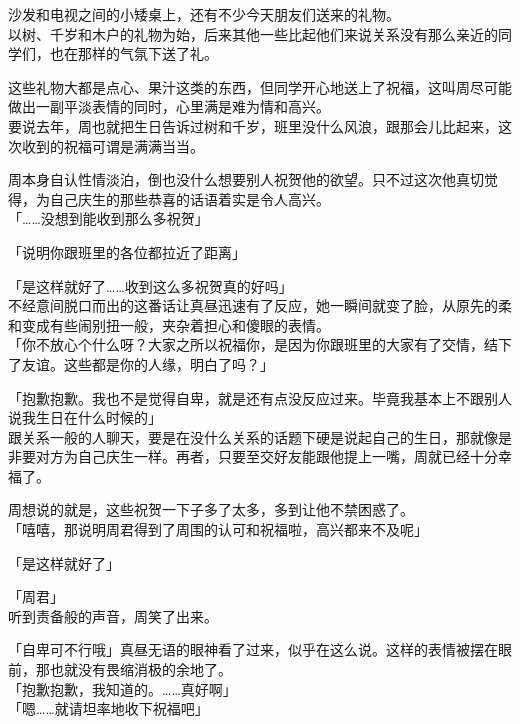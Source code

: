 沙发和电视之间的小矮桌上，还有不少今天朋友们送来的礼物。\\

以树、千岁和木户的礼物为始，后来其他一些比起他们来说关系没有那么亲近的同学们，也在那样的气氛下送了礼。

这些礼物大都是点心、果汁这类的东西，但同学开心地送上了祝福，这叫周尽可能做出一副平淡表情的同时，心里满是难为情和高兴。\\

要说去年，周也就把生日告诉过树和千岁，班里没什么风浪，跟那会儿比起来，这次收到的祝福可谓是满满当当。

周本身自认性情淡泊，倒也没什么想要别人祝贺他的欲望。只不过这次他真切觉得，为自己庆生的那些恭喜的话语着实是令人高兴。\\

「……没想到能收到那么多祝贺」

「说明你跟班里的各位都拉近了距离」

「是这样就好了……收到这么多祝贺真的好吗」\\

不经意间脱口而出的这番话让真昼迅速有了反应，她一瞬间就变了脸，从原先的柔和变成有些闹别扭一般，夹杂着担心和傻眼的表情。\\

「你不放心个什么呀？大家之所以祝福你，是因为你跟班里的大家有了交情，结下了友谊。这些都是你的人缘，明白了吗？」

「抱歉抱歉。我也不是觉得自卑，就是还有点没反应过来。毕竟我基本上不跟别人说我生日在什么时候的」\\

跟关系一般的人聊天，要是在没什么关系的话题下硬是说起自己的生日，那就像是非要对方为自己庆生一样。再者，只要至交好友能跟他提上一嘴，周就已经十分幸福了。

周想说的就是，这些祝贺一下子多了太多，多到让他不禁困惑了。\\

「嘻嘻，那说明周君得到了周围的认可和祝福啦，高兴都来不及呢」

「是这样就好了」

「周君」\\

听到责备般的声音，周笑了出来。

「自卑可不行哦」真昼无语的眼神看了过来，似乎在这么说。这样的表情被摆在眼前，那也就没有畏缩消极的余地了。\\

「抱歉抱歉，我知道的。……真好啊」\\

「嗯……就请坦率地收下祝福吧」\\

